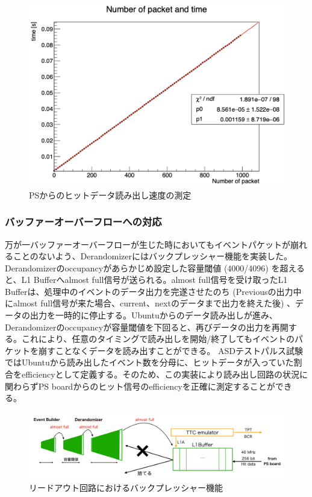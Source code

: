 \baselineskip
\begin{figure} 
\centering
\includegraphics[width=16cm]{fig/QAQC/JTAHubreadspeed.png}
\caption[PSからのヒットデータ読み出し速度の測定]{PSからのヒットデータ読み出し速度の測定}
\label{JTAHubreadspeed}
\end{figure}

\subsubsection{バッファーオーバーフローへの対応} \par
万が一バッファーオーバーフローが生じた時においてもイベントパケットが崩れることのないよう、Derandomizerにはバックプレッシャー機能を実装した。Derandomizerのoccupancyがあらかじめ設定した容量閾値 (4000/4096) を超えると、L1 Bufferへalmost full信号が送られる。almost full信号を受け取ったL1 Bufferは、処理中のイベントのデータ出力を完遂させたのち (Previousの出力中にalmost full信号が来た場合、current、nextのデータまで出力を終えた後) 、データの出力を一時的に停止する。Ubuntuからのデータ読み出しが進み、Derandomizerのoccupancyが容量閾値を下回ると、再びデータの出力を再開する。これにより、任意のタイミングで読み出しを開始/終了してもイベントのパケットを崩すことなくデータを読み出すことができる。
ASDテストパルス試験ではUbuntuから読み出したイベント数を分母に、ヒットデータが入っていた割合をefficiencyとして定義する。そのため、この実装により読み出し回路の状況に関わらずPS boardからのヒット信号のefficiencyを正確に測定することができる。
\baselineskip

\begin{figure} 
\centering
\includegraphics[width=16cm]{fig/QAQC/JATHubbackpressure.png}
\caption[リードアウト回路におけるバックプレッシャー機能]{リードアウト回路におけるバックプレッシャー機能}
\label{JATHubbackpressure}
\end{figure}

